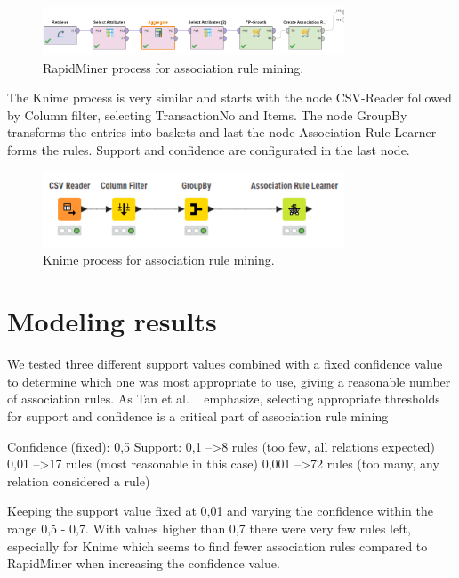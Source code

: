 \begin{figure}[H]
\centering
\includegraphics[width=0.8\textwidth]{figures/AssociationRulesRapidMinerProcess.png}
\caption{RapidMiner process for association rule mining.}
\label{fig:AssociationRulesRapidMinerProcess}
\end{figure}

The Knime process is very similar and starts with the node CSV-Reader followed by Column filter,
selecting TransactionNo and Items. The node GroupBy transforms the entries into baskets and last
the node Association Rule Learner forms the rules. Support and confidence are configurated in the
last node.

\begin{figure}[H]
\centering
\includegraphics[width=0.8\textwidth]{figures/AssociationRulesKnimeProcess.png}
\caption{Knime process for association rule mining.}
\label{fig:KnimeProcess}
\end{figure}

\section{Modeling results}
We tested three different support values combined with a fixed confidence value to determine which
one was most appropriate to use, giving a reasonable number of association rules. As Tan et 
al. ~\cite[Ch.~5, Sec.~5.3]{courseLitt} emphasize, selecting appropriate thresholds for support and confidence 
is a critical part of association rule mining

Confidence (fixed): 0,5
Support:
0,1 --\textgreater 8 rules (too few, all relations expected)
0,01 --\textgreater 17 rules (most reasonable in this case)
0,001 --\textgreater 72 rules (too many, any relation considered a rule)

Keeping the support value fixed at 0,01 and varying the confidence within the range 0,5 - 0,7.
With values higher than 0,7 there were very few rules left, especially for Knime which seems to
find fewer association rules compared to RapidMiner when increasing the confidence value.

